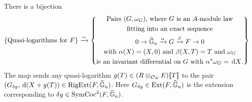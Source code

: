 \documentclass[../main.tex]{subfiles}
\begin{document}
\begin{thm}
  \label{thm:RigExtStr}
  There is a bijection
  \begin{equation}\label{eq:QLogBijection}
    \{\text{Quasi-logarithms for $F$}\} \xrightarrow{\sim} 
      \left\{
      \begin{gathered}
        \text{Pairs $(G, \omega_G)$, where $G$ is an $A$-module law} \\
        \text{fitting into  an exact sequence}
        \\ 0 \to \widehat{\mathbb{G}}_a \xrightarrow{\alpha} G \xrightarrow{\beta} F \to 0 \\
        \text{with $\alpha(X) = (X, 0)$ and $\beta(X, T) = T$ and $\omega_G$} \\
        \text{is an invariant differential on $G$ with 
        $\alpha^* \omega_G = \, \mathrm{d} X$.} \\
      \end{gathered}
      \right\}
  \end{equation}
  The map sends any quasi-logarithm $g(T) \in (R\otimes_{\mathcal{O}_E} E)\llbracket T \rrbracket$
to the pair $(G_{\delta g}, \, \mathrm{d} (X + g(T)) \in \operatorname {RigExt}(F, \widehat{\mathbb{G}}_a)$. Here
$G_{\delta g} \in \operatorname{Ext}(F, \widehat{\mathbb{G}}_a)$ is the extension corresponding to 
$\delta g \in \operatorname{SymCoc}^2(F,\widehat{\mathbb{G}}_a)$. 


\end{thm}
\end{document}
